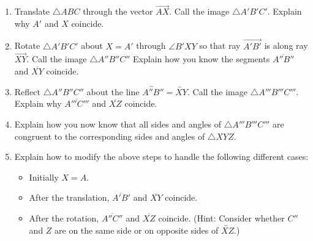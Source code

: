 \begin{prob}
\begin{enumerate}
\item Translate $\triangle ABC$ through the vector $\overrightarrow{AX}$.  Call the image $\triangle A'B'C'$.  Explain why $A'$ and $X$ coincide.
\item Rotate $\triangle A'B'C'$ about $X=A'$ through $\angle B'XY$ so that ray $\overrightarrow{A'B'}$ is along ray $\overrightarrow{XY}$.  Call the image $\triangle A''B''C''$   Explain how you know the segments $\overline{A''B''}$ and $\overline{XY}$ coincide. 
\item Reflect $\triangle A''B''C''$ about the line $\overleftrightarrow{A''B''} = \overleftrightarrow{XY}$.  Call the image $\triangle A'''B'''C'''$.  Explain why $\overline{A'''C'''}$ and $\overline{XZ}$ coincide.
\item Explain how you now know that all sides and angles of $\triangle A'''B'''C'''$ are congruent to the corresponding sides and angles of $\triangle XYZ$.  
\item Explain how to modify the above steps to handle the following different cases: 
\begin{itemize}
\item Initially $X = A$. 
\item After the translation, $\overline{A'B'}$ and $\overline{XY}$ coincide. 
\item After the rotation, $\overline{A''C''}$ and $\overline{XZ}$ coincide.  (Hint:  Consider whether $C''$ and $Z$ are on the same side or on opposite sides of $\overleftrightarrow{XZ}$.)  
\end{itemize}
\end{enumerate}
\end{prob}

